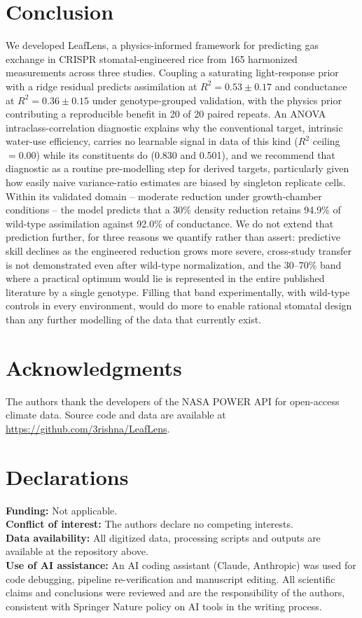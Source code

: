 \documentclass[runningheads]{llncs}
\begin{document}
\section{Conclusion}\label{sec:conclusion}

We developed LeafLens, a physics-informed framework for predicting gas exchange in CRISPR stomatal-engineered rice from 165 harmonized measurements across three studies. Coupling a saturating light-response prior with a ridge residual predicts assimilation at $R^{2}=0.53\pm0.17$ and conductance at $R^{2}=0.36\pm0.15$ under genotype-grouped validation, with the physics prior contributing a reproducible benefit in 20 of 20 paired repeats. An ANOVA intraclass-correlation diagnostic explains why the conventional target, intrinsic water-use efficiency, carries no learnable signal in data of this kind ($R^2$ ceiling $=0.00$) while its constituents do (0.830 and 0.501), and we recommend that diagnostic as a routine pre-modelling step for derived targets, particularly given how easily naive variance-ratio estimates are biased by singleton replicate cells. Within its validated domain -- moderate reduction under growth-chamber conditions -- the model predicts that a 30\% density reduction retains 94.9\% of wild-type assimilation against 92.0\% of conductance. We do not extend that prediction further, for three reasons we quantify rather than assert: predictive skill declines as the engineered reduction grows more severe, cross-study transfer is not demonstrated even after wild-type normalization, and the 30--70\% band where a practical optimum would lie is represented in the entire published literature by a single genotype. Filling that band experimentally, with wild-type controls in every environment, would do more to enable rational stomatal design than any further modelling of the data that currently exist.

\section*{Acknowledgments}
The authors thank the developers of the NASA POWER API for open-access climate data. Source code and data are available at \url{https://github.com/3rishna/LeafLens}.

\section*{Declarations}
\textbf{Funding:} Not applicable. \\
\textbf{Conflict of interest:} The authors declare no competing interests. \\
\textbf{Data availability:} All digitized data, processing scripts and outputs are available at the repository above. \\
\textbf{Use of AI assistance:} An AI coding assistant (Claude, Anthropic) was used for code debugging, pipeline re-verification and manuscript editing. All scientific claims and conclusions were reviewed and are the responsibility of the authors, consistent with Springer Nature policy on AI tools in the writing process.
\end{document}

